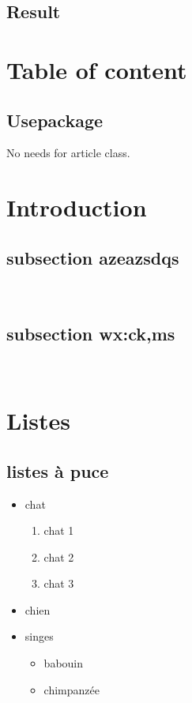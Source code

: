 \documentclass[a4paper,12pt]{article}
\begin{document}
\subsection{Result}

\begin{abstract}
\blindtext
\end{abstract}

\newpage
\section{Table of content}
\subsection{Usepackage}
No needs for article class.
\section{Introduction}


\subsection{subsection azeazsdqs}
\blindtext \\
\subsection{subsection wx:ck,ms}
\blindtext \\

\newpage
\section{Listes}
\subsection{listes à puce}

\renewcommand\labelitemi{X}

\begin{itemize}
  \item chat
  \begin{enumerate}
    \item chat 1
    \item chat 2
    \item chat 3
  \end{enumerate}
  \item chien
  \item singes
  \begin{itemize}
    \item babouin
    \item chimpanzée
  \end{itemize}
\end{itemize}
\end{document}
